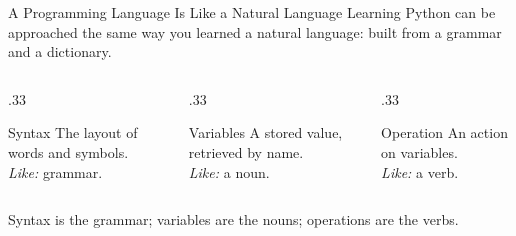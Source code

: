 \documentclass[9pt,aspectratio=169,xcolor=table]{beamer}
\begin{document}
\begin{frame}{A Programming Language Is Like a Natural Language}
    \leavevmode
    Learning Python can be approached the same way you learned a natural
    language: built from a \alert{grammar} and a \alert{dictionary}.

    \vspace{3mm}
    \begin{columns}[t]
        \begin{column}{.33\textwidth}
            \begin{block}{Syntax}
                \small The layout of words and symbols. \\[1mm]
                \emph{Like:} grammar.
            \end{block}
        \end{column}
        \begin{column}{.33\textwidth}
            \begin{block}{Variables}
                \small A stored value, retrieved by name. \\[1mm]
                \emph{Like:} a noun.
            \end{block}
        \end{column}
        \begin{column}{.33\textwidth}
            \begin{block}{Operation}
                \small An action on variables. \\[1mm]
                \emph{Like:} a verb.
            \end{block}
        \end{column}
    \end{columns}

    \vspace{4mm}
    \begin{center}
        \small Syntax is the grammar; variables are the nouns; operations
        are the verbs.
    \end{center}
\end{frame}
\end{document}
